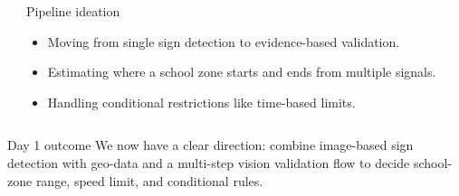 \documentclass[aspectratio=169]{beamer}
\begin{document}
\begin{frame}[plain,shrink=6]
\begin{columns}[T,onlytextwidth,totalwidth=\textwidth]
\begin{center}
	\end{center}

	\begin{block}{Pipeline ideation}
	\footnotesize
	\begin{itemize}
		\item Moving from single sign detection to evidence-based validation.
		\item Estimating where a school zone starts and ends from multiple signals.
		\item Handling conditional restrictions like time-based limits.
	\end{itemize}
	\end{block}
\end{columns}

\vfill
\begin{block}{Day 1 outcome}
We now have a clear direction: combine image-based sign detection with geo-data and a multi-step vision validation flow to decide school-zone range, speed limit, and conditional rules.
\end{block}

\end{frame}
\end{document}
